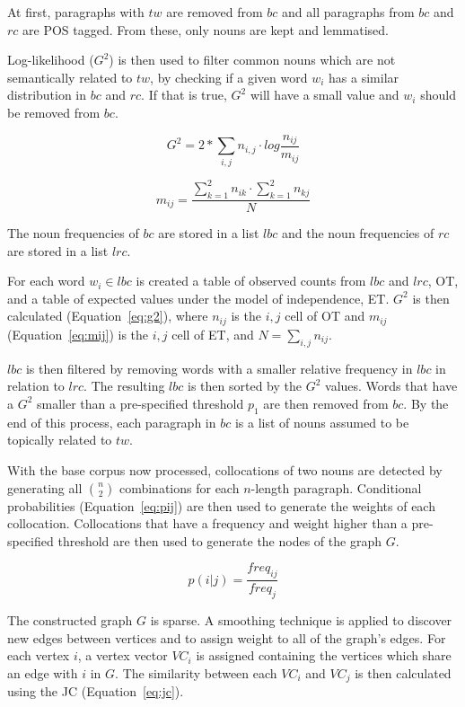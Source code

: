At first, paragraphs with $tw$ are removed from $bc$ and all paragraphs from
$bc$ and $rc$ are \ac{POS} tagged. From these, only nouns are kept and
lemmatised.

Log-likelihood ($G^2$) is then used to filter common nouns which are not
semantically related to $tw$, by checking if a given word $w_i$ has a similar
distribution in $bc$ and $rc$. If that is true, $G^2$ will have a small value
and $w_i$ should be removed from $bc$.

\begin{equation}\label{eq:g2}
 G^2 = 2 * \sum_{i,j} n_{i,j} \cdot log \frac{n_{ij}}{m_{ij}}
\end{equation}

\begin{equation}\label{eq:mij}
 m_{ij} = \frac{\sum_{k=1}^2 n_{ik} \cdot \sum_{k=1}^2 n_{kj}}
               {N}
\end{equation}

The noun frequencies of $bc$ are stored in a list $lbc$ and the noun
frequencies of $rc$ are stored in a list $lrc$.

For each word $w_i \in lbc$ is created a table of observed counts from $lbc$
and $lrc$, OT, and a table of expected values under the model of independence,
ET. $G^2$ is then calculated (Equation~\ref{eq:g2}), where $n_{ij}$ is the
$i,j$ cell of OT and $m_{ij}$ (Equation~\ref{eq:mij}) is the $i,j$ cell of ET,
and $N = \sum_{i,j} n_{ij}$.

$lbc$ is then filtered by removing words with a smaller relative frequency in
$lbc$ in relation to $lrc$. The resulting $lbc$ is then sorted by the $G^2$
values. Words that have a $G^2$ smaller than a pre-specified threshold $p_1$
are then removed from $bc$. By the end of this process, each paragraph in $bc$
is a list of nouns assumed to be topically related to $tw$.

With the base corpus now processed, collocations of two nouns are detected by
generating all $\binom{n}{2}$ combinations for each $n$-length paragraph.
Conditional probabilities (Equation~\ref{eq:pij}) are then used to generate the
weights of each collocation. Collocations that have a frequency and weight
higher than a pre-specified threshold are then used to generate the nodes of the
graph $G$.

\begin{equation}\label{eq:pij}
 p(i|j) = \frac{freq_{ij}}{freq_{j}}
\end{equation}

The constructed graph $G$ is sparse. A smoothing technique is applied to
discover new edges between vertices and to assign weight to all of the graph's
edges. For each vertex $i$, a vertex vector $VC_i$ is assigned containing the
vertices which share an edge with $i$ in $G$. The similarity between each $VC_i$
and $VC_j$ is then calculated using the \ac{JC} (Equation~\ref{eq:jc}).

